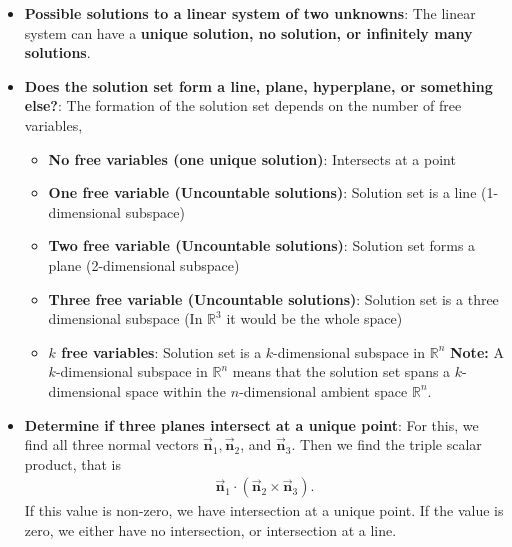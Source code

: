 \documentclass{report}
\begin{document}
    \pagebreak 
    \begin{itemize}
        \item \textbf{Possible solutions to a linear system of two unknowns}: The linear system can have a \textbf{unique solution, no solution, or infinitely many solutions}.
            \item \textbf{Does the solution set form a line, plane, hyperplane, or something else?}: The formation of the solution set depends on the number of free variables,
                \begin{itemize}
                    \item \textbf{No free variables (one unique solution)}: Intersects at a point
                    \item \textbf{One free variable (Uncountable solutions)}: Solution set is a line (1-dimensional subspace)
                    \item \textbf{Two free variable (Uncountable solutions)}: Solution set forms a plane (2-dimensional subspace)
                    \item \textbf{Three free variable (Uncountable solutions)}: Solution set is a three dimensional subspace (In $\mathbb{R}^{3}$ it would be the whole space)
                    \item \textbf{$k$ free variables}: Solution set is a $k$-dimensional subspace in $\mathbb{R}^{n} $
                        \bigbreak \noindent 
                        \textbf{Note:} A \( k \)-dimensional subspace in \( \mathbb{R}^n \) means that the solution set spans a \( k \)-dimensional space within the \( n \)-dimensional ambient space \( \mathbb{R}^n \).

                \end{itemize}

        \item \textbf{Determine if three planes intersect at a unique point}: For this, we find all three normal vectors $\vec{\mathbf{n}}_{1}, \vec{\mathbf{n}}_{2}$, and $\vec{\mathbf{n}}_{3}$. Then we find the triple scalar product, that is
            \begin{align*}
                \vec{\mathbf{n}}_{1} \cdot (\vec{\mathbf{n}}_{2} \times \vec{\mathbf{n}}_{3})
            .\end{align*}
            If this value is non-zero, we have intersection at a unique point. If the value is zero, we either have no intersection, or intersection at a line.

    \end{itemize}
\end{document}
